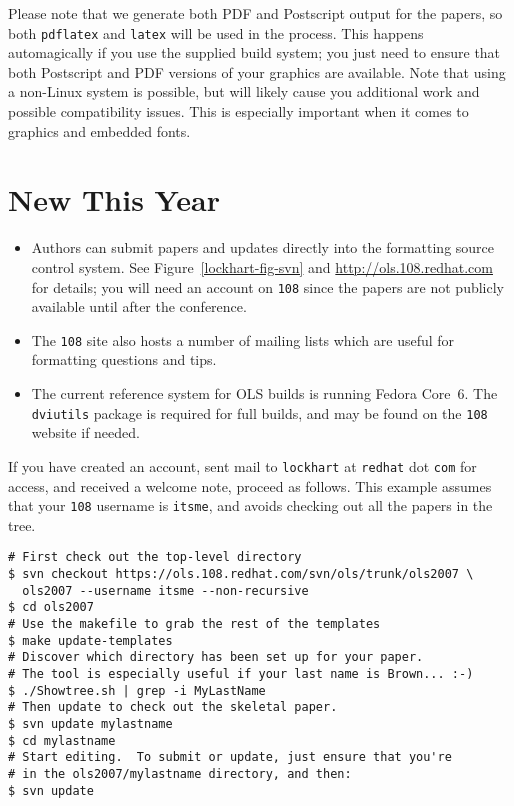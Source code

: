 \documentclass[final]{ols}
\begin{document}
Please note that we generate both PDF and Postscript output for the
papers, so both \texttt{pdflatex} and \texttt{latex} will be used in the
process.  This happens automagically if you use the supplied build system;
you just need to ensure that both Postscript and PDF versions of your
graphics are available.  Note that using a non-Linux system is possible,
but will likely cause you additional work and possible compatibility
issues.  This is especially important when it comes to graphics and
embedded fonts.

\section{New This Year}
\begin{itemize}
\item Authors can submit papers and updates directly into the formatting
source control system.  See Figure~\ref{lockhart-fig-svn} and
\url{http://ols.108.redhat.com} for details; you will need an account on
\texttt{108} since the papers are not publicly available until after the
conference. 
\item The \texttt{108} site also hosts a number of mailing lists which are
useful for formatting questions and tips.
\item The current reference system for OLS builds is running Fedora
Core~6.  The \texttt{dviutils} package is required for full builds, and
may be found on the \texttt{108} website if needed.
\end{itemize}

\begin{figure*}[hbt]
\begin{shaded}
If you have created an account, sent mail to \texttt{lockhart} at
\texttt{redhat} dot \texttt{com} for access, and received a welcome note,
proceed as follows.  This example assumes that  your \texttt{108} username
is \texttt{itsme}, and avoids checking out all the papers in the tree.
\begin{center}
\begin{small}
\begin{verbatim}
# First check out the top-level directory
$ svn checkout https://ols.108.redhat.com/svn/ols/trunk/ols2007 \
  ols2007 --username itsme --non-recursive
$ cd ols2007
# Use the makefile to grab the rest of the templates
$ make update-templates
# Discover which directory has been set up for your paper.
# The tool is especially useful if your last name is Brown... :-)
$ ./Showtree.sh | grep -i MyLastName
# Then update to check out the skeletal paper.
$ svn update mylastname
$ cd mylastname
# Start editing.  To submit or update, just ensure that you're
# in the ols2007/mylastname directory, and then:
$ svn update
\end{verbatim}
\end{small}
\caption{Setting up and Using Subversion with OLS Papers}
\label{lockhart-fig-svn}
\end{center}
\end{shaded}
\end{figure*}
\end{document}
